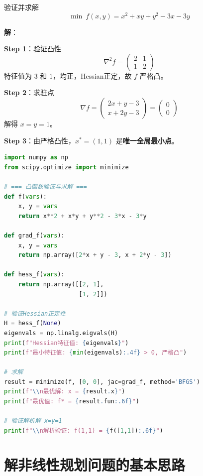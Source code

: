 \begin{example}[凸规划的验证与求解]
验证并求解
\[
\min\ f(x, y) = x^2 + xy + y^2 - 3x - 3y
\]

\textbf{解}：

\textbf{Step 1}：验证凸性
\[
\nabla^2 f = \begin{pmatrix} 2 & 1 \\ 1 & 2 \end{pmatrix}
\]
特征值为 $3$ 和 $1$，均正，Hessian正定，故 $f$ 严格凸。

\textbf{Step 2}：求驻点
\[
\nabla f = \begin{pmatrix} 2x + y - 3 \\ x + 2y - 3 \end{pmatrix} = \begin{pmatrix} 0 \\ 0 \end{pmatrix}
\]
解得 $x = y = 1$。

\textbf{Step 3}：由严格凸性，$x^* = (1, 1)$ 是\textbf{唯一全局最小点}。
\end{example}

\begin{lstlisting}[language=Python, caption=凸性验证与全局最优求解]
import numpy as np
from scipy.optimize import minimize

# === 凸函数验证与求解 ===
def f(vars):
    x, y = vars
    return x**2 + x*y + y**2 - 3*x - 3*y

def grad_f(vars):
    x, y = vars
    return np.array([2*x + y - 3, x + 2*y - 3])

def hess_f(vars):
    return np.array([[2, 1],
                     [1, 2]])

# 验证Hessian正定性
H = hess_f(None)
eigenvals = np.linalg.eigvals(H)
print(f"Hessian特征值: {eigenvals}")
print(f"最小特征值: {min(eigenvals):.4f} > 0, 严格凸")

# 求解
result = minimize(f, [0, 0], jac=grad_f, method='BFGS')
print(f"\\n最优解: x = {result.x}")
print(f"最优值: f* = {result.fun:.6f}")

# 验证解析解 x=y=1
print(f"\\n解析验证: f(1,1) = {f([1,1]):.6f}")
\end{lstlisting}

\section{解非线性规划问题的基本思路}\label{sec:solution-approach}

